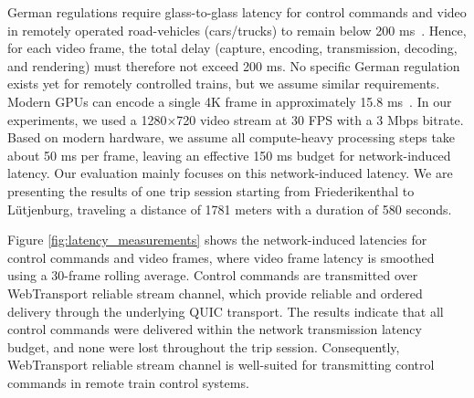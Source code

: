 
    German regulations require glass-to-glass latency for control commands and video in remotely operated road-vehicles (cars/trucks) to remain below 200 ms~\cite{StVFernLV2025}. Hence, for each video frame, the total delay (capture, encoding, transmission, decoding, and rendering) must therefore not exceed 200 ms. No specific German regulation exists yet for remotely controlled trains, but we assume similar requirements. Modern GPUs can encode a single 4K frame in approximately 15.8 ms~\cite{ArunruangsirilertK24}. In our experiments, we used a 1280×720 video stream at 30 FPS with a 3 Mbps bitrate. Based on modern hardware, we assume all compute-heavy processing steps take about 50 ms per frame, leaving an effective 150 ms budget for network-induced latency. Our evaluation mainly focuses on this network-induced latency. We are presenting the results of one trip session starting from Friederikenthal to Lütjenburg, traveling a distance of 1781 meters with a duration of 580 seconds.

    Figure \ref{fig:latency_measurements} shows the network-induced latencies for control commands and video frames, where video frame latency is smoothed using a 30-frame rolling average. Control commands are transmitted over WebTransport reliable stream channel, which provide reliable and ordered delivery through the underlying QUIC transport. The results indicate that all control commands were delivered within the network transmission latency budget, and none were lost throughout the trip session. Consequently, WebTransport reliable stream channel is well-suited for transmitting control commands in remote train control systems.


